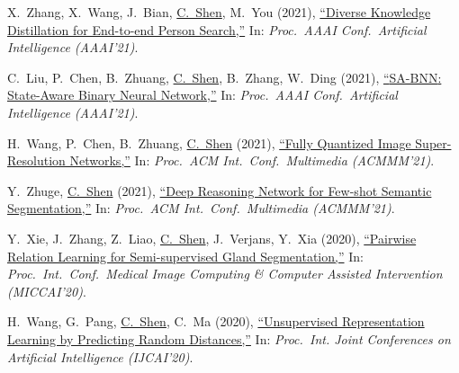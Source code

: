 \documentclass[9pt, a4paper]{article}
\newcommand{\years}[1]{\marginnote{\scriptsize #1}}
\def\highlight{\uline}
\begin{document}
\medskip

\years{2021} X.~Zhang, X.~Wang, J.~Bian, \highlight{C.~Shen}, M.~You (2021),
\href{http://www.google.com/search?lr=&ie=UTF-8&oe=UTF-8&q=Diverse+Knowledge+Distillation+for+End-to-end+Person+Search+Xinyu+Zhang%2C+Xinlong+Wang%2C+Jia-Wang+Bian%2C+Chunhua+Shen%2C+Minyu+You}{``Diverse Knowledge Distillation for End-to-end Person Search,{}''}
In: \emph{Proc.\ AAAI Conf.\  Artificial Intelligence (AAAI'21)}.

\medskip

\years{2021} C.~Liu, P.~Chen, B.~Zhuang, \highlight{C.~Shen}, B.~Zhang, W.~Ding (2021),
\href{http://www.google.com/search?lr=&ie=UTF-8&oe=UTF-8&q=SA-BNN%3A+State-Aware+Binary+Neural+Network+Chunlei+Liu%2C+Peng+Chen%2C+Bohan+Zhuang%2C+Chunhua+Shen%2C+Baochang+Zhang%2C+Wenrui+Ding}{``{SA-BNN}: State-Aware Binary Neural Network,{}''}
In: \emph{Proc.\ AAAI Conf.\  Artificial Intelligence (AAAI'21)}.

\medskip

\years{2021} H.~Wang, P.~Chen, B.~Zhuang, \highlight{C.~Shen} (2021),
\href{http://www.google.com/search?lr=&ie=UTF-8&oe=UTF-8&q=Fully+Quantized+Image+Super-Resolution+Networks+Hu+Wang%2C+Peng+Chen%2C+Bohan+Zhuang%2C+Chunhua+Shen}{``Fully Quantized Image Super-Resolution Networks,{}''}
In: \emph{Proc.\ ACM Int.\ Conf.\  Multimedia (ACMMM'21)}.

\medskip

\years{2021} Y.~Zhuge, \highlight{C.~Shen} (2021),
\href{http://www.google.com/search?lr=&ie=UTF-8&oe=UTF-8&q=Deep+Reasoning+Network+for+Few-shot+Semantic+Segmentation+Yuzhi+Zhuge%2C+Chunhua+Shen}{``Deep Reasoning Network for Few-shot Semantic Segmentation,{}''}
In: \emph{Proc.\ ACM Int.\ Conf.\  Multimedia (ACMMM'21)}.

\medskip

\years{2020} Y.~Xie, J.~Zhang, Z.~Liao, \highlight{C.~Shen}, J.~Verjans, Y.~Xia (2020),
\href{http://www.google.com/search?lr=&ie=UTF-8&oe=UTF-8&q=Pairwise+Relation+Learning+for+Semi-supervised+Gland+Segmentation+Yutong+Xie%2C+Jianpeng+Zhang%2C+Zhibin+Liao%2C+Chunhua+Shen%2C+Johan+Verjans%2C+Yong+Xia}{``Pairwise Relation Learning for Semi-supervised Gland Segmentation,{}''}
In: \emph{Proc.\ Int.\ Conf.\  Medical Image Computing \& Computer Assisted Intervention (MICCAI'20)}.

\medskip

\years{2020} H.~Wang, G.~Pang, \highlight{C.~Shen}, C.~Ma (2020),
\href{http://www.google.com/search?lr=&ie=UTF-8&oe=UTF-8&q=Unsupervised+Representation+Learning+by+Predicting+Random+Distances+Hu+Wang%2C+Guansong+Pang%2C+Chunhua+Shen%2C+Congbo+Ma}{``Unsupervised Representation Learning by Predicting Random Distances,{}''}
In: \emph{Proc.\ Int. Joint Conferences on Artificial Intelligence (IJCAI'20)}.
\end{document}
